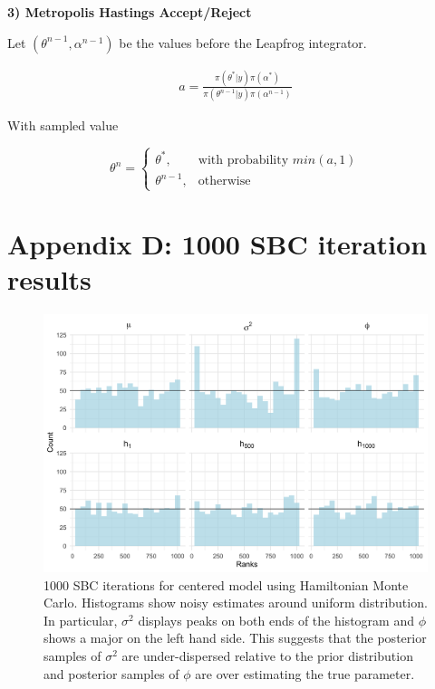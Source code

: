 \documentclass[12pt, a4paper]{article}
\begin{document}
\textbf{3) Metropolis Hastings Accept/Reject}

Let $(\theta^{n-1}, \alpha^{n-1})$ be the values before the Leapfrog integrator.

$$
\begin{aligned}
a = \frac{\pi(\theta^{\ast} | y) \pi(\alpha^{\ast})}{\pi(\theta^{n-1} | y) \pi(\alpha^{n-1})}
\end{aligned}
$$

With sampled value

$$
\theta^n = \begin{cases}
    \theta^{\ast},& \text{with probability } min(a,1)\\
    \theta^{n-1}, & \text{otherwise}
\end{cases}
$$

\section{Appendix D: 1000 SBC iteration results}

    \begin{figure}[H]
        \centering
        \includegraphics[scale=0.09]{results/hmc_cp_1k.png}
        \caption{1000 SBC iterations for centered model using Hamiltonian Monte Carlo. Histograms show noisy estimates around uniform distribution. In particular, $\sigma^2$ displays peaks on both ends of the histogram and $\phi$ shows a major on the left hand side. This suggests that the posterior samples of $\sigma^2$ are under-dispersed relative to the prior distribution and posterior samples of $\phi$ are over estimating the true parameter.}
        \label{fig:cphmc1k}
    \end{figure} 
\end{document}
